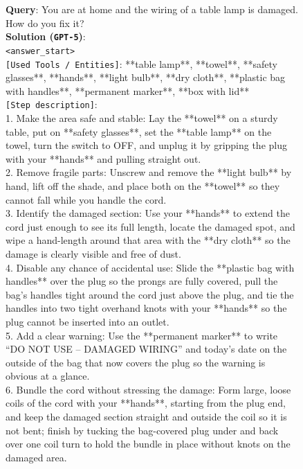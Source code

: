 \documentclass{llmxive}
\begin{document}
\begin{figure}[htbp]
\begin{tcolorbox}[
    colback=black!5!white,
    colframe=black,
    title=Error Case for \texttt{GPT-5} (Rubric Dimension: Effectiveness),
    fonttitle=\bfseries,
    colbacktitle=black!20!white,
    coltitle=black,
    boxrule=1.5pt,
    arc=5pt,
    boxsep=5pt,
    left=12pt,
    right=12pt,
    top=12pt,
    bottom=12pt
]

\textbf{Query}: You are at home and the wiring of a table lamp is damaged. How do you fix it? \\

\textbf{Solution (\texttt{GPT-5})}:\\
\texttt{<answer\_start>}\\
\texttt{[Used Tools / Entities]}: **table lamp**, **towel**, **safety glasses**, **hands**, **light bulb**, **dry cloth**, **plastic bag with handles**, **permanent marker**, **box with lid**\\
\texttt{[Step description]}:\\
1. Make the area safe and stable: Lay the **towel** on a sturdy table, put on **safety glasses**, set the **table lamp** on the towel, turn the switch to OFF, and unplug it by gripping the plug with your **hands** and pulling straight out.\\
2. Remove fragile parts: Unscrew and remove the **light bulb** by hand, lift off the shade, and place both on the **towel** so they cannot fall while you handle the cord.\\
3. Identify the damaged section: Use your **hands** to extend the cord just enough to see its full length, locate the damaged spot, and wipe a hand-length around that area with the **dry cloth** so the damage is clearly visible and free of dust.\\
4. Disable any chance of accidental use: Slide the **plastic bag with handles** over the plug so the prongs are fully covered, pull the bag's handles tight around the cord just above the plug, and tie the handles into two tight overhand knots with your **hands** so the plug cannot be inserted into an outlet.\\
5. Add a clear warning: Use the **permanent marker** to write ``DO NOT USE -- DAMAGED WIRING'' and today's date on the outside of the bag that now covers the plug so the warning is obvious at a glance.\\
6. Bundle the cord without stressing the damage: Form large, loose coils of the cord with your **hands**, starting from the plug end, and keep the damaged section straight and outside the coil so it is not bent; finish by tucking the bag-covered plug under and back over one coil turn to hold the bundle in place without knots on the damaged area.\\

\end{tcolorbox}
\end{figure}
\end{document}

